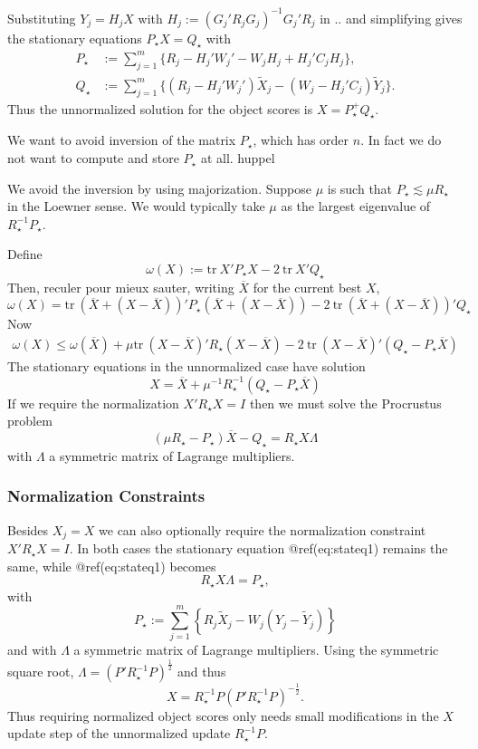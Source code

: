 \documentclass[
  12pt,
  letterpaper,
  DIV=11,
  numbers=noendperiod]{scrartcl}
\begin{document}
Substituting \(Y_j=H_jX\) with \(H_j:=(G_j'R_jG_j)^{-1}G_j'R_j\) in ..
and simplifying gives the stationary equations \(P_\star X= Q_\star\)
with \begin{subequations}
\begin{align}
P_\star&:=\sum_{j=1}^m\{R_j-H_j'W_j'-W_jH_j+H_j'C_jH_j\},\\
Q_\star&:=\sum_{j=1}^m\{(R_j-H_j'W_j')\tilde X_j-(W_j-H_j'C_j)\tilde Y_j\}.
\end{align}
\end{subequations} Thus the unnormalized solution for the object scores
is \(X=P^+_\star Q_\star\).

We want to avoid inversion of the matrix \(P_\star\), which has order
\(n\). In fact we do not want to compute and store \(P_\star\) at all.
huppel

We avoid the inversion by using majorization. Suppose \(\mu\) is such
that \(P_\star\lesssim\mu R_\star\) in the Loewner sense. We would
typically take \(\mu\) as the largest eigenvalue of
\(R_\star^{-1}P_\star\).

Define \[
\omega(X):=\text{tr}\ X'P_\star X-2\ \text{tr}\ X'Q_\star
\] Then, reculer pour mieux sauter, writing \(\overline{X}\) for the
current best \(X\), \[
\omega(X)=\text{tr}\ (\overline X+(X-\overline X))'P_\star(\overline X+(X-\overline X))-2\ \text{tr}\ (\overline X+(X-\overline X))'Q_\star
\] Now \begin{multline}
\omega(X)\leq\omega(\overline X)+
\mu\text{tr}\ (X-\overline X)'R_\star(X-\overline X)-2\ \text{tr}\ (X-\overline X)'(Q_\star-P_\star\overline X)
\end{multline} The stationary equations in the unnormalized case have
solution \[
X=\overline X+\mu^{-1}R_\star^{-1}(Q_\star-P_\star\overline X)
\] If we require the normalization \(X'R_\star X=I\) then we must solve
the Procrustus problem \[
(\mu R_\star-P_\star)\overline X - Q_\star=R_\star X\Lambda
\] with \(\Lambda\) a symmetric matrix of Lagrange multipliers.

\subsubsection{Normalization
Constraints}\label{normalization-constraints}

Besides \(X_j=X\) we can also optionally require the normalization
constraint \(X'R_\star X=I\). In both cases the stationary equation
@ref(eq:stateq1) remains the same, while @ref(eq:stateq1) becomes \[
R_\star X\Lambda=P_\star,
\] with \[
P_\star:=\sum_{j=1}^m\left\{R_j\tilde X_j-W_j(Y_j-\tilde Y_j)\right\}
\] and with \(\Lambda\) a symmetric matrix of Lagrange multipliers.
Using the symmetric square root, \(\Lambda=(P'R_\star^{-1}P)^\frac12\)
and thus \[
X=R_\star^{-1}P(P'R_\star^{-1}P)^{-\frac12}.
\] Thus requiring normalized object scores only needs small
modifications in the \(X\) update step of the unnormalized update
\(R_\star^{-1}P\).
\end{document}
